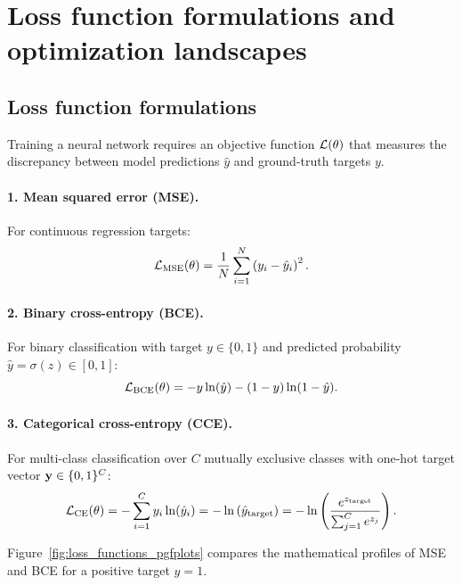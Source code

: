 \documentclass[../../main.tex]{subfiles}
\begin{document}
\clearpage
\section{Loss function formulations and optimization landscapes}
\label{sec:output_loss_opt}

\subsection{Loss function formulations}
Training a neural network requires an objective function $\mathcal{L}(\theta)$ that measures the discrepancy between model predictions $\hat{y}$ and ground-truth targets $y$.

\paragraph{1. Mean squared error (MSE).}
For continuous regression targets:
\begin{equation}
\label{eq:mse_loss}
\mathcal{L}_{\text{MSE}}(\theta) = \frac{1}{N} \sum_{i=1}^N \left( y_i - \hat{y}_i \right)^2.
\end{equation}

\paragraph{2. Binary cross-entropy (BCE).}
For binary classification with target $y \in \{0, 1\}$ and predicted probability $\hat{y} = \sigma(z) \in [0, 1]$:
\begin{equation}
\label{eq:bce_loss}
\mathcal{L}_{\text{BCE}}(\theta) = - y \ln(\hat{y}) - (1 - y) \ln(1 - \hat{y}).
\end{equation}

\paragraph{3. Categorical cross-entropy (CCE).}
For multi-class classification over $C$ mutually exclusive classes with one-hot target vector $\mathbf{y} \in \{0, 1\}^C$:
\begin{equation}
\label{eq:cce_loss}
\mathcal{L}_{\text{CE}}(\theta) = - \sum_{i=1}^C y_i \ln(\hat{y}_i) = - \ln\left( \hat{y}_{\text{target}} \right) = - \ln\left( \frac{e^{z_{\text{target}}}}{\sum_{j=1}^C e^{z_j}} \right).
\end{equation}

Figure~\ref{fig:loss_functions_pgfplots} compares the mathematical profiles of MSE and BCE for a positive target $y = 1$.
\end{document}

